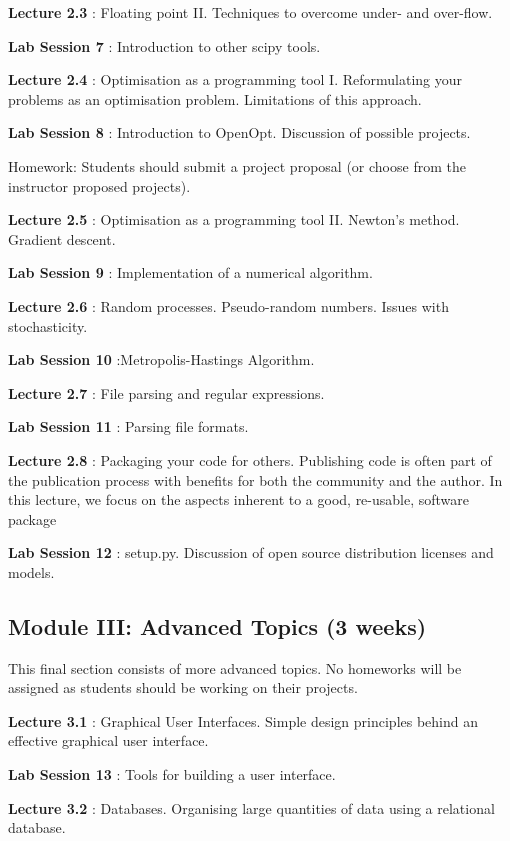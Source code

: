 \documentclass{article}
\newcommand*{\Lecture}[1]{%
{\bf #1}%
}
\begin{document}
\Lecture{Lecture 2.3}: Floating point II. Techniques to overcome under- and over-flow.

\Lecture{Lab Session 7}: Introduction to other scipy tools.

\Lecture{Lecture 2.4}: Optimisation as a programming tool I. Reformulating your problems as an optimisation problem. Limitations of this approach.

\Lecture{Lab Session 8}: Introduction to OpenOpt. Discussion of possible projects.

Homework: Students should submit a project proposal (or choose from the instructor proposed projects).

\Lecture{Lecture 2.5}: Optimisation as a programming tool II. Newton's method. Gradient descent.

\Lecture{Lab Session 9}: Implementation of a numerical algorithm.

\Lecture{Lecture 2.6}: Random processes. Pseudo-random numbers. Issues with stochasticity.

\Lecture{Lab Session 10}:Metropolis-Hastings Algorithm.

\Lecture{Lecture 2.7}: File parsing and regular expressions.

\Lecture{Lab Session 11}: Parsing file formats.

\Lecture{Lecture 2.8}: Packaging your code for others. Publishing code is often part of the publication process with benefits for both the community and the author. In this lecture, we focus on the aspects inherent to a good, re-usable, software package

\Lecture{Lab Session 12}: setup.py. Discussion of open source distribution licenses and models.

\subsection{Module III: Advanced Topics (3 weeks)}

This final section consists of more advanced topics. No homeworks will be assigned as students should be working on their projects.

\Lecture{Lecture 3.1}: Graphical User Interfaces. Simple design principles behind an effective graphical user interface.

\Lecture{Lab Session 13}: Tools for building a user interface.

\Lecture{Lecture 3.2}: Databases. Organising large quantities of data using a relational database.
\end{document}
